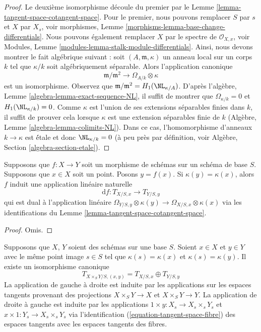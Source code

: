 \begin{proof}
Le deuxième isomorphisme découle du premier par le Lemme
\ref{lemma-tangent-space-cotangent-space}. Pour le premier, nous
pouvons remplacer $S$ par $s$ et $X$ par $X_s$, voir morphismes,
Lemme \ref{morphisms-lemma-base-change-differentials}. Nous
pouvons également remplacer $X$ par le spectre de $\mathcal{O}_{X,
x}$, voir Modules, Lemme
\ref{modules-lemma-stalk-module-differentials}. Ainsi, nous devons montrer le fait
algébrique suivant : soit $(A, \mathfrak m, \kappa)$ un anneau local sur un corps
$k$ tel que $\kappa/k$ soit algébriquement séparable. Alors l'application canonique
$$
\mathfrak m/\mathfrak m^2
\longrightarrow
\Omega_{A/k} \otimes \kappa
$$
est un isomorphisme. Observez que $\mathfrak
m/\mathfrak m^2 = H_1(\NL_{\kappa/A})$. D'après
l'algèbre, Lemme \ref{algebra-lemma-exact-sequence-NL},
il suffit de montrer que $\Omega_{\kappa/k} = 0$ et
$H_1(\NL_{\kappa/k}) = 0$. Comme $\kappa$ est l'union de
ses extensions séparables finies dans $k$, il suffit de
prouver cela lorsque $\kappa$ est une extension séparables
finie de $k$ (Algèbre, Lemme
\ref{algebra-lemma-colimits-NL}). Dans ce cas, l'homomorphisme
d'anneaux $k \to \kappa$ est \' étale et donc $\NL_{\kappa/k} = 0$ (à peu
près par définition, voir Algèbre, Section \ref{algebra-section-etale}).
\end{proof}

\begin{lemma}
\label{lemma-map-tangent-spaces}
Supposons que $f : X \to Y$ soit un morphisme de schémas sur un schéma de
base $S$. Supposons que $x \in X$ soit un point. Posons $y = f(x)$. Si
$\kappa(y) = \kappa(x)$, alors $f$ induit une application linéaire naturelle
$$
\text{d}f : T_{X/S, x} \longrightarrow T_{Y/S, y}
$$
qui est dual à l'application linéaire $\Omega_{Y/S, y} \otimes
\kappa(y) \to \Omega_{X/S, x} \otimes \kappa(x)$ via les
identifications du Lemme \ref{lemma-tangent-space-cotangent-space}.
\end{lemma}

\begin{proof}
Omis.
\end{proof}

\begin{lemma}
\label{lemma-tangent-space-product}
Supposons que $X$, $Y$ soient des schémas sur une base $S$. Soient $x \in
X$ et $y \in Y$ avec le même point image $s \in S$ tel que $\kappa(s) =
\kappa(x)$ et $\kappa(s) = \kappa(y)$. Il existe un isomorphisme canonique
$$
T_{X \times_S Y/S, (x, y)} = T_{X/S, x} \oplus T_{Y/S, y}
$$
La application de gauche à droite est induite par les
applications sur les espaces tangents provenant des
projections $X \times_S Y \to X$ et $X \times_S Y \to Y$. La
application de droite à gauche est induite par les applications $1
\times y : X_s \to X_s \times_s Y_s$ et $x \times 1 : Y_s \to X_s
\times_s Y_s$ via l'identification
(\ref{equation-tangent-space-fibre}) des espaces tangents avec les espaces tangents des fibres.
\end{lemma}

